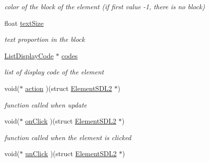 \begin{DoxyCompactItemize}
\begin{DoxyCompactList}\small\item\em color of the block of the element (if first value -\/1, there is no block) \end{DoxyCompactList}\item 
float \hyperlink{structElementSDL2_a49a55a004e56ad15b5b0f0cb0045c83f}{text\+Size}\hypertarget{structElementSDL2_a49a55a004e56ad15b5b0f0cb0045c83f}{}\label{structElementSDL2_a49a55a004e56ad15b5b0f0cb0045c83f}

\begin{DoxyCompactList}\small\item\em text proportion in the block \end{DoxyCompactList}\item 
\hyperlink{structListDisplayCode}{List\+Display\+Code} $\ast$ \hyperlink{structElementSDL2_a60652c6e4cf3d38aadbc650a624d2999}{codes}\hypertarget{structElementSDL2_a60652c6e4cf3d38aadbc650a624d2999}{}\label{structElementSDL2_a60652c6e4cf3d38aadbc650a624d2999}

\begin{DoxyCompactList}\small\item\em list of display code of the element \end{DoxyCompactList}\item 
void($\ast$ \hyperlink{structElementSDL2_a86441847b7f6595e3405d6d9bbf1b8d9}{action} )(struct \hyperlink{structElementSDL2}{Element\+S\+D\+L2} $\ast$)\hypertarget{structElementSDL2_a86441847b7f6595e3405d6d9bbf1b8d9}{}\label{structElementSDL2_a86441847b7f6595e3405d6d9bbf1b8d9}

\begin{DoxyCompactList}\small\item\em function called when update \end{DoxyCompactList}\item 
void($\ast$ \hyperlink{structElementSDL2_ae56c022599e2e8acdda29fbb8af44942}{on\+Click} )(struct \hyperlink{structElementSDL2}{Element\+S\+D\+L2} $\ast$)\hypertarget{structElementSDL2_ae56c022599e2e8acdda29fbb8af44942}{}\label{structElementSDL2_ae56c022599e2e8acdda29fbb8af44942}

\begin{DoxyCompactList}\small\item\em function called when the element is clicked \end{DoxyCompactList}\item 
void($\ast$ \hyperlink{structElementSDL2_a0ad4094686063db36244b474fe42a336}{un\+Click} )(struct \hyperlink{structElementSDL2}{Element\+S\+D\+L2} $\ast$)\hypertarget{structElementSDL2_a0ad4094686063db36244b474fe42a336}{}\label{structElementSDL2_a0ad4094686063db36244b474fe42a336}


\end{DoxyCompactItemize}
